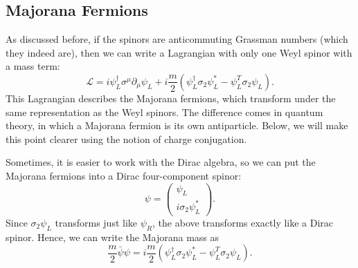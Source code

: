 \documentclass[11pt]{article}
\theoremstyle{definition}
\begin{document}
\subsection{Majorana Fermions}
As discussed before, if the spinors are anticommuting Grassman numbers (which they indeed are), then we can write a Lagrangian with only one Weyl spinor with a mass term:
\begin{equation}
    \mathcal{L} = i\psi_L^\dagger\sigma^\mu\partial_\mu\psi_L + i \frac{m}{2}(\psi_L^\dagger\sigma_2\psi_L^* - \psi_L^T\sigma_2\psi_L).
\end{equation}
This Lagrangian describes the Majorana fermions, which transform under the same representation as the Weyl spinors. The difference comes in quantum theory, in which a Majorana fermion is its own antiparticle. Below, we will make this point clearer using the notion of charge conjugation.

Sometimes, it is easier to work with the Dirac algebra, so we can put the Majorana fermions into a Dirac four-component spinor:
\begin{equation}
    \psi = \begin{pmatrix}
        \psi_L \\ i\sigma_2\psi_L^*
    \end{pmatrix}.
\end{equation}
Since $\sigma_2\psi_L$ transforms just like $\psi_R$, the above transforms exactly like a Dirac spinor. Hence, we can write the Majorana mass as
\begin{equation}
    \frac{m}{2}\bar{\psi}\psi = i \frac{m}{2}(\psi_L^\dagger\sigma_2\psi_L^* - \psi_L^T\sigma_2\psi_L).
\end{equation}
\end{document}
